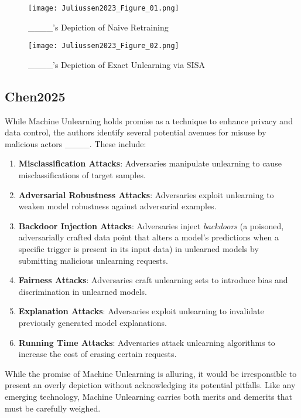         \begin{figure}[H]
            \centering
            \texttt{[image: Juliussen2023\_Figure\_01.png]}
            \caption{____'s Depiction of Naive Retraining}
        \end{figure}
        
        \begin{figure}[H]
            \centering
            \texttt{[image: Juliussen2023\_Figure\_02.png]}
            \caption{____'s Depiction of Exact Unlearning via SISA}
        \end{figure}

    \subsection{Chen2025}
    \label{subsec:Chen2025}

        While Machine Unlearning holds promise as a technique to enhance privacy and data control, the authors identify several potential avenues for misuse by malicious actors ____. These include:
        
        \begin{enumerate}[label=(Atk. \arabic*):, left=2em]
            \item \textbf{Misclassification Attacks}: Adversaries manipulate unlearning to cause misclassifications of target samples.
            \item \textbf{Adversarial Robustness Attacks}: Adversaries exploit unlearning to weaken model robustness against adversarial examples.
            \item \textbf{Backdoor Injection Attacks}: Adversaries inject \textit{backdoors} (a poisoned, adversarially crafted data point that alters a model's predictions when a specific trigger is present in its input data) in unlearned models by submitting malicious unlearning requests.
            \item \textbf{Fairness Attacks}: Adversaries craft unlearning sets to introduce bias and discrimination in unlearned models.
            \item \textbf{Explanation Attacks}: Adversaries exploit unlearning to invalidate previously generated model explanations.
            \item \textbf{Running Time Attacks}: Adversaries attack unlearning algorithms to increase the cost of erasing certain requests.
        \end{enumerate}
        
        While the promise of Machine Unlearning is alluring, it would be irresponsible to present an overly  depiction without acknowledging its potential pitfalls. Like any emerging technology, Machine Unlearning carries both merits and demerits that must be carefully weighed.